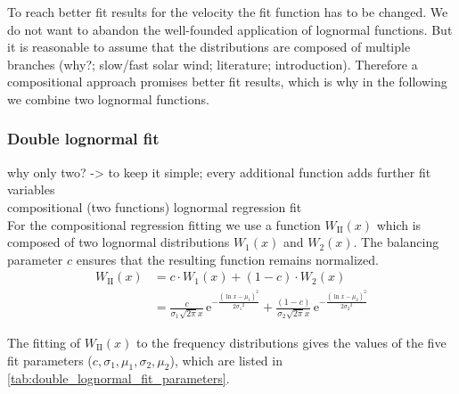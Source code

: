 To reach better fit results for the velocity the fit function has to be changed. We do not want to abandon the well-founded application of lognormal functions. But it is reasonable to assume that the distributions are composed of multiple branches (why?; slow/fast solar wind; literature; introduction). Therefore a compositional approach promises better fit results, which is why in the following we combine two lognormal functions.\\


\subsubsection{Double lognormal fit}

why only two? -> to keep it simple; every additional function adds further fit variables\\
compositional (two functions) lognormal regression fit\\

For the compositional regression fitting we use a function $W_\text{II}(x)$ which is composed of two lognormal distributions $W_1(x)$ and $W_2(x)$. The balancing parameter $c$ ensures that the resulting function remains normalized.
\begin{align}
	W_\text{II}(x) &= c \cdot W_1(x) + (1 -c) \cdot W_2(x)\\
	&= \frac{c}{\sigma_1 \sqrt{2 \pi} x} \, \text{e}^{- \frac{(\ln x - \mu_1)^2}{2 {\sigma_1}^2}} + \frac{(1 - c)}{\sigma_2 \sqrt{2 \pi} x} \, \text{e}^{- \frac{(\ln x - \mu_2)^2}{2 {\sigma_2}^2}} \label{eq:double_lognormal_fit_function}
\end{align}

The fitting of $W_\text{II}(x)$ to the frequency distributions gives the values of the five fit para\-meters ($c, \sigma_1, \mu_1, \sigma_2, \mu_2$), which are listed in \autoref{tab:double_lognormal_fit_parameters}.\\

